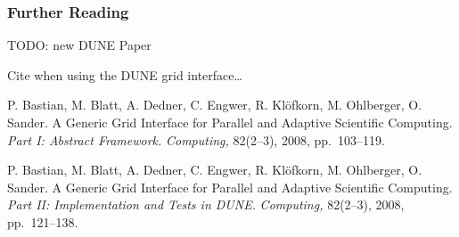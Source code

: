 \documentclass[aspectratio=169,11pt]{beamer}
\theoremstyle{definition}
\begin{document}
\begin{frame} \frametitle<presentation>{Further Reading}

    TODO: new DUNE Paper
    
    Cite when using the DUNE grid interface\ldots
    \begingroup
    \renewcommand{\section}[2]{}%
    \begin{thebibliography}{}

P. Bastian, M. Blatt, A. Dedner, C. Engwer, R. Klöfkorn, M. Ohlberger,
O. Sander.
\newblock A Generic Grid Interface for Parallel and Adaptive
Scientific Computing.
\emph{Part I: Abstract Framework.}
\newblock \emph{Computing,} 82(2--3), 2008, pp.~103--119.

P. Bastian, M. Blatt, A. Dedner, C. Engwer, R. Klöfkorn, M. Ohlberger,
O. Sander.
\newblock A Generic Grid Interface for Parallel and Adaptive
Scientific Computing.
\emph{Part II: Implementation and Tests in DUNE.}
\newblock \emph{Computing,} 82(2--3), 2008, pp.~121--138.

\end{thebibliography}
    \endgroup
\end{frame}
\end{document}
